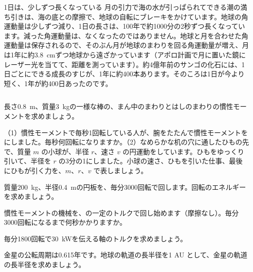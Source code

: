 \begin{column}{1日は、少しずつ長くなっている}
月の引力で海の水が引っぱられてできる潮の満ち引きは、海の底との摩擦で、地球の自転にブレーキをかけています。地球の角運動量は少しずつ減り、1日の長さは、100年で約1000分の2秒ずつ長くなっています。減った角運動量は、なくなったのではありません。地球と月を合わせた角運動量は保存されるので、そのぶん月が地球のまわりを回る角運動量が増え、月は1年に約\qty{3.8}{cm}ずつ地球から遠ざかっています（アポロ計画で月に置いた鏡にレーザー光を当てて、距離を測っています）。約4億年前のサンゴの化石には、1日ごとにできる成長のすじが、1年に約400本あります。そのころは1日が今より短く、1年が約400日あったのです。
\end{column}

\bkendproblems
{}

\bkproblem 長さ\qty{0.8}{m}、質量\qty{3}{kg}の一様な棒の、まん中のまわりとはしのまわりの慣性モーメントを求めましょう。

\bkproblem （1）慣性モーメントで毎秒1回転している人が、腕をたたんで慣性モーメントをにしました。毎秒何回転になりますか。（2）なめらかな机の穴に通したひもの先で、質量 $m$ の小球が、半径 $r$、速さ $v$ の円運動をしています。ひもをゆっくり引いて、半径を $r$ の3分の1にしました。小球の速さ、ひもを引いた仕事、最後にひもが引く力を、$m$、$r$、$v$ で表しましょう。

\bkproblem 質量\qty{200}{kg}、半径\qty{0.4}{m}の円板を、毎分3000回転で回します。回転のエネルギーを求めましょう。

\bkproblem 慣性モーメントの機械を、の一定のトルクで回し始めます（摩擦なし）。毎分3000回転になるまで何秒かかりますか。

\bkproblem 毎分1800回転で\qty{30}{kW}を伝える軸のトルクを求めましょう。

\bkproblem 金星の公転周期は0.615年です。地球の軌道の長半径を1 AU として、金星の軌道の長半径を求めましょう。

